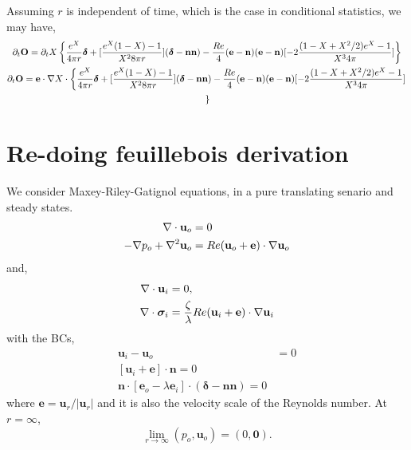 Assuming $r$ is independent of time, which is the case in conditional statistics, we may have,
\begin{multline}
    \partial_t \textbf{O} =
    \partial_t X \left\{\frac{e^X}{4\pi r}\bm\delta
    +
    [
        \frac{ e^X (1-X) -1}{X^2 8 \pi r}  
        ] 
    (\bm\delta  - \textbf{nn} )
    -
    \frac{Re}{4}(\textbf{e} - \textbf{n})
    (\textbf{e} - \textbf{n})
    [
        -2 \frac{(1-X+ X^2 /2) e^X - 1}{X^3 4 \pi}
        ]\right\}\\
    \partial_t \textbf{O} =
    \textbf{e}\cdot \mathbf{\nabla} X \cdot \left\{\frac{e^X}{4\pi r}\bm\delta
    +
    [
        \frac{ e^X (1-X) -1}{X^2 8 \pi r}  
        ] 
    (\bm\delta  - \textbf{nn} )
    -
    \frac{Re}{4}(\textbf{e} - \textbf{n})
    (\textbf{e} - \textbf{n})
    [
        -2 \frac{(1-X+ X^2 /2) e^X - 1}{X^3 4 \pi}
        ]
    \right. \\ \left.     
    \right\}
\end{multline}



\section{Re-doing feuillebois derivation}

We consider Maxey-Riley-Gatignol equations, in a pure translating senario and steady states.
\begin{align}
    \mathbf{\nabla}\cdot \textbf{u}_{o} &= 0
    \\
    -\mathbf{\nabla} p_o + \mathbf{\nabla}^2 \textbf{u}_o
    &=
    Re  (\textbf{u}_o + \textbf{e})\cdot \mathbf{\nabla} \textbf{u}_{o}
\end{align}
and,
\begin{align}
    \mathbf{\nabla}\cdot \textbf{u}_{i} &= 0,
    \\
    \mathbf{\nabla}\cdot\bm\sigma_{i}
    &=
    \frac{\zeta}{\lambda}Re  (\textbf{u}_{i} + \textbf{e}) \cdot \mathbf{\nabla} \textbf{u}_{i}
\end{align}
with the BCs,
\begin{align}
    \textbf{u}_i - \textbf{u}_o &= 0\\
    [\textbf{u}_i + \textbf{e}]\cdot \textbf{n} = 0 \\
    \textbf{n}\cdot [\textbf{e}_o - \lambda \textbf{e}_i ]\cdot (\bm\delta - \textbf{nn}) = 0
\end{align}
where $\textbf{e} = \textbf{u}_r / |\textbf{u}_r|$ and it is also the velocity scale of the Reynolds number.
At $r = \infty$,
\begin{equation}
    \lim_{r\to\infty} (p_o,\textbf{u}_o) = (0,\textbf{0}).
\end{equation}

